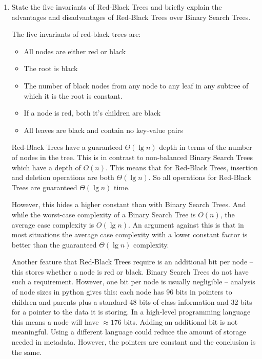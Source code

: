 \documentclass[10pt,\jkfside,a4paper]{article}
\begin{document}
\begin{enumerate}
\item State the five invariants of Red-Black Trees and briefly explain the advantages and disadvantages
of Red-Black Trees over Binary Search Trees.

The five invariants of red-black trees are:
\begin{itemize}

\item All nodes are either red or black

\item The root is black

\item The number of black nodes from any node to any leaf in any subtree of which it is the root is constant.

\item If a node is red, both it's children are black

\item All leaves are black and contain no key-value pairs

\end{itemize}

Red-Black Trees have a guaranteed $\Theta(\lg n)$ depth in terms of the number of nodes in the tree. This is in contrast to 
non-balanced Binary Search Trees which have a depth of $O(n)$. This means that for Red-Black Trees, insertion and deletion 
operations are both $\Theta(\lg n)$. So all operations for Red-Black Trees are guaranteed $\Theta(\lg n)$ time.

However, this hides a higher constant than with Binary Search Trees. And while the worst-case complexity of a Binary 
Search Tree is $O(n)$, the average case complexity is $O(\lg n)$. An argument against this is that in most situations 
the average case complexity with a lower constant factor is better than the guaranteed $\Theta(\lg n)$ complexity.

Another feature that Red-Black Trees require is an additional bit per node -- this stores whether a node is red or 
black. Binary Search Trees do not have such a requirement. However, one bit per node is usually negligible -- analysis 
of node sizes in python gives this: each node has 96 bits in pointers to children and parents plus a standard 48 bits 
of class information and 32 bits for a pointer to the data it is storing. In a high-level programming language this 
means a node will have $\approx 176$ bits. Adding an additional bit is not meaningful. Using a different 
language could reduce the amount of storage needed in metadata. However, the pointers are constant and the conclusion is 
the same.


\end{enumerate}
\end{document}
